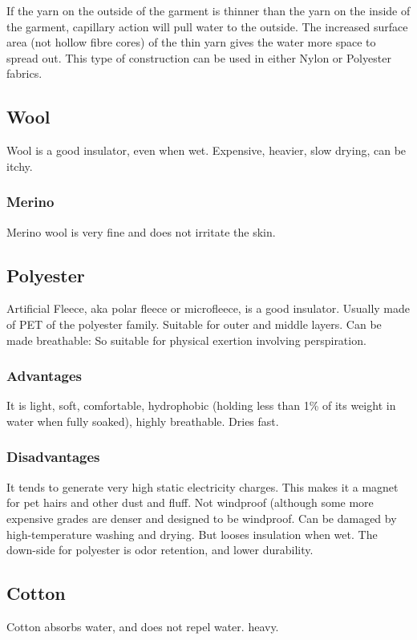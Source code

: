 \documentclass[oneside, article]{memoir}
\begin{document}
If the yarn on the outside of the garment is thinner than the yarn on the inside of the garment, capillary action will pull water to the outside. The increased surface area (not hollow fibre cores) of the thin yarn gives the water more space to spread out. This type of construction can be used in either Nylon or Polyester fabrics.

\subsection{Wool}
Wool is a good insulator, even when wet. Expensive, heavier, slow drying, can be itchy. 

\subsubsection{Merino}
Merino wool is very fine and does not irritate the skin.

\subsection{Polyester}
Artificial Fleece, aka polar fleece or microfleece, is a good insulator. Usually made of PET of the polyester family. Suitable for outer and middle layers. Can be made breathable: So suitable for physical exertion involving perspiration.

\subsubsection{Advantages}
It is light, soft, comfortable, hydrophobic (holding less than 1\% of its weight in water when fully soaked), highly breathable. Dries fast. 
    
\subsubsection{Disadvantages}
It tends to generate very high static electricity charges. This makes it a magnet for pet hairs and other dust and fluff. Not windproof (although some more expensive grades are denser and designed to be windproof. Can be damaged by high-temperature washing and drying. But looses insulation when wet. The down-side for polyester is odor retention, and lower durability.

\subsection{Cotton}
Cotton absorbs water, and does not repel water. heavy.
\end{document}
